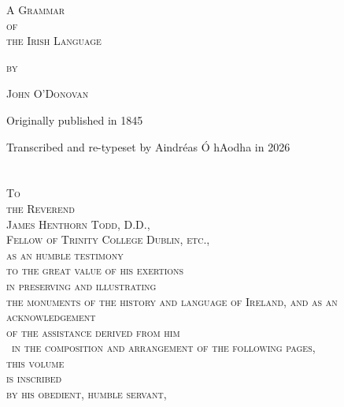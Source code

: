 \documentclass[11pt,oneside]{memoir}
\author{Aindréas Ó hAodha}
\begin{document}
\begin{titlingpage}
    \centering
    \vspace*{3cm}

    {\Huge \textsc{A Grammar}} \\[0.25cm]
    \Large{\textsc{of}} \\[0.25cm]
    {\Huge \textsc{the Irish Language}}

    \vspace{1.5cm}

    {\Large \textsc{by}\par}

    \vspace{0.5cm}

    {\LARGE
    \textsc{John O'Donovan}\par}

    \vfill

    {\large
    Originally published in 1845\par}

    \vspace{0.5cm}

    {\large Transcribed and re-typeset by Aindréas Ó hAodha in 2026\par}
\end{titlingpage}

\chapter*{}
\begin{center}
    \textsc{
        \Large
        To\\
        the Reverend\\[0.3cm]
        {\Huge James Henthorn Todd, D.D.,}\\[0.3cm]
        Fellow of Trinity College Dublin, etc.,\\
        as an humble testimony\\
        to the great value of his exertions\\
        in preserving and illustrating\\
        the monuments of the history and language of Ireland,
        and as an acknowledgement\\
        of the assistance derived from him\\\
        in the composition and arrangement of the following pages,\\[0.3cm]
        {\Huge this volume}\\[0.3cm]
        is inscribed\\
        by his obedient, humble servant,\\
}
\end{center}
\end{document}
